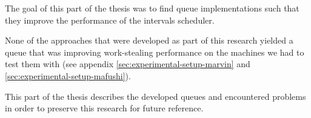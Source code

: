 The goal of this part of the thesis was to find queue implementations
such that they improve the performance of the intervals scheduler.

None of the approaches that were developed as part of this research
yielded a queue that was improving work-stealing performance on the
machines we had to test them with (see appendix
\ref{sec:experimental-setup-marvin} and
\ref{sec:experimental-setup-mafushi}).


This part of the thesis describes the developed queues and encountered
problems in order to preserve this research for future reference.


